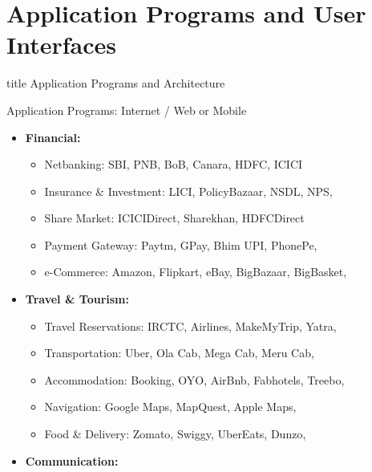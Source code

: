 \documentclass[aspectratio=169, xcolor=dvipsnames]{beamer}
\begin{document}
\section{Application Programs and User Interfaces}
\begin{frame}
  \vfill
  \centering
  \begin{beamercolorbox}[sep=8pt,center,shadow=true,rounded=true]{title}
    Application Programs and Architecture\par%
  \end{beamercolorbox}
  \vfill
\end{frame}

\begin{frame}{Application Programs: Internet / Web or Mobile}
    \begin{itemize}[<+->]
        \item \textbf{Financial:}
        \begin{itemize}
            \item[$\triangleright$] Netbanking: SBI, PNB, BoB, Canara, HDFC, ICICI
            \item[$\triangleright$] Insurance \& Investment: LICI, PolicyBazaar, NSDL, NPS,
            \item[$\triangleright$] Share Market: ICICIDirect, Sharekhan, HDFCDirect
            \item[$\triangleright$] Payment Gateway: Paytm, GPay, Bhim UPI, PhonePe,
            \item[$\triangleright$] e-Commerce: Amazon, Flipkart, eBay, BigBazaar, BigBasket,
        \end{itemize}
        \item \textbf{Travel \& Tourism:}
        \begin{itemize}
            \item[$\triangleright$] Travel Reservations: IRCTC, Airlines, MakeMyTrip, Yatra,
            \item[$\triangleright$] Transportation: Uber, Ola Cab, Mega Cab, Meru Cab,
            \item[$\triangleright$] Accommodation: Booking, OYO, AirBnb, Fabhotels, Treebo,
            \item[$\triangleright$] Navigation: Google Maps, MapQuest, Apple Maps,
            \item[$\triangleright$] Food \& Delivery: Zomato, Swiggy, UberEats, Dunzo,
        \end{itemize}
        \item \textbf{Communication:}

\end{itemize}
\end{frame}
\end{document}
